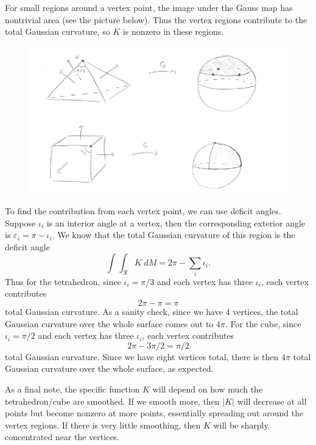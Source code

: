 \documentclass[10pt]{report}
\begin{document}
For small regions around a vertex point, the image under the Gauss map has nontrivial area (see the picture below). Thus the vertex regions contribute to the total Gaussian curvature, so $K$ is nonzero in these regions.

\begin{figure}[H]
	\centering
	\includegraphics[scale=0.6]{fig/vertex.pdf}
\end{figure}


To find the contribution from each vertex point, we can use deficit angles. Suppose $\iota_i$ is an interior angle at a vertex, then the corresponding exterior angle is $\varepsilon_i = \pi-\iota_i$. We know that the total Gaussian curvature of this region is the deficit angle
\[
	\int_{} \int_{\mathscr{R}} K\;dM = 2\pi - \sum_i \iota_i.
\] Thus for the tetrahedron, since $\iota_i = \pi/3$ and each vertex has three $\iota_i$, each vertex contributes
\[
	2\pi - \pi = \pi
\] total Gaussian curvature. As a sanity check, since we have 4 vertices, the total Gaussian curvature over the whole surface comes out to $4\pi$. For the cube, since $\iota_i = \pi/2$ and each vertex has three $\iota_i$, each vertex contributes
\[
2\pi-3\pi/2 = \pi/2
\] total Gaussian curvature. Since we have eight vertices total, there is then $4\pi$ total Gaussian curvature over the whole surface, as expected.

As a final note, the specific function $K$ will depend on how much the tetrahedron/cube are smoothed. If we smooth more, then $|K|$ will decrease at all points but become nonzero at more points, essentially spreading out around the vertex regions. If there is very little smoothing, then $K$ will be sharply concentrated near the vertices.
\end{document}
